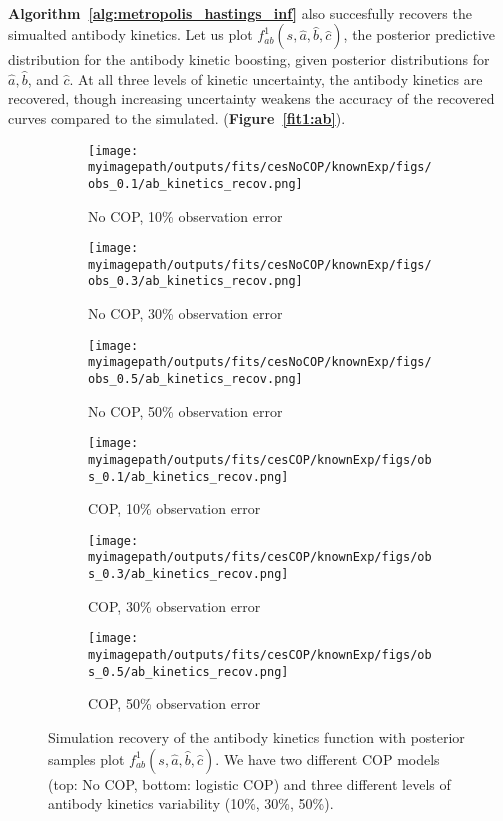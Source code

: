 \paragraph{} \textbf{Algorithm~\ref{alg:metropolis_hastings_inf}} also succesfully recovers the simualted antibody kinetics. Let us plot $f^1_{ab}(s, \hat{a}, \hat{b}, \hat{c})$, the posterior predictive distribution for the antibody kinetic boosting, given posterior distributions for $ \hat{a}, \hat{b}$, and $\hat{c}$. At all three levels of kinetic uncertainty, the antibody kinetics are recovered, though increasing uncertainty weakens the accuracy of the recovered curves compared to the simulated. (\textbf{Figure~\ref{fit1:ab}}).

\begin{figure}[H]
\label{fit1:ab}
    \centering
    \begin{subfigure}{0.31\textwidth}
        \centering
        \texttt{[image: \\myimagepath/outputs/fits/cesNoCOP/knownExp/figs/obs\_0.1/ab\_kinetics\_recov.png]}
        \caption{No COP, 10\% observation error}
    \end{subfigure}
    \begin{subfigure}{0.31\textwidth}
        \centering
        \texttt{[image: \\myimagepath/outputs/fits/cesNoCOP/knownExp/figs/obs\_0.3/ab\_kinetics\_recov.png]}
        \caption{No COP, 30\% observation error}
    \end{subfigure}
    \begin{subfigure}{0.31\textwidth}
        \centering
        \texttt{[image: \\myimagepath/outputs/fits/cesNoCOP/knownExp/figs/obs\_0.5/ab\_kinetics\_recov.png]}
        \caption{No COP, 50\% observation error}
    \end{subfigure}
    
  \begin{subfigure}{0.31\textwidth}
        \centering
        \texttt{[image: \\myimagepath/outputs/fits/cesCOP/knownExp/figs/obs\_0.1/ab\_kinetics\_recov.png]}
        \caption{ COP, 10\% observation error}
    \end{subfigure}
    \begin{subfigure}{0.31\textwidth}
        \centering
        \texttt{[image: \\myimagepath/outputs/fits/cesCOP/knownExp/figs/obs\_0.3/ab\_kinetics\_recov.png]}
        \caption{ COP, 30\% observation error}
    \end{subfigure}
    \begin{subfigure}{0.31\textwidth}
        \centering
        \texttt{[image: \\myimagepath/outputs/fits/cesCOP/knownExp/figs/obs\_0.5/ab\_kinetics\_recov.png]}
        \caption{ COP, 50\% observation error}
    \end{subfigure}
    
    \caption{Simulation recovery of the antibody kinetics function with posterior samples plot $f^1_{ab}(s, \hat{a}, \hat{b}, \hat{c})$. We have two different COP models (top: No COP, bottom: logistic COP) and three different levels of antibody kinetics variability (10\%, 30\%, 50\%).}

\end{figure}




